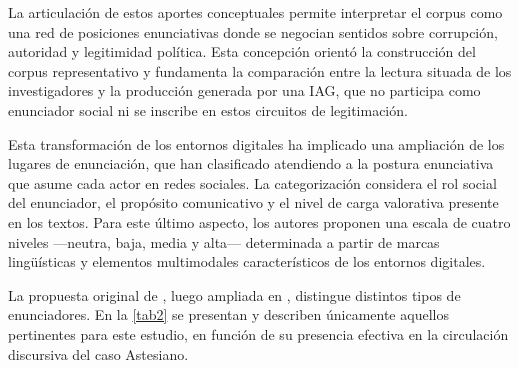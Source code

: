 \documentclass[spanish]{textolivre}
\begin{document}
La articulación de estos aportes conceptuales permite interpretar el corpus como una red de posiciones enunciativas donde se negocian sentidos sobre corrupción, autoridad y legitimidad política. Esta concepción orientó la construcción del corpus representativo y fundamenta la comparación entre la lectura situada de los investigadores y la producción generada por una IAG, que no participa como enunciador social ni se inscribe en estos circuitos de legitimación.

Esta transformación de los entornos digitales ha implicado una ampliación de los lugares de enunciación, que  \textcite{gambetta2021desequilibrio,gambettaabella2024media} han clasificado atendiendo a la postura enunciativa que asume cada actor en redes sociales. La categorización considera el rol social del enunciador, el propósito comunicativo y el nivel de carga valorativa presente en los textos. Para este último aspecto, los autores proponen una escala de cuatro niveles —neutra, baja, media y alta— determinada a partir de marcas lingüísticas y elementos multimodales característicos de los entornos digitales.

La propuesta original de \textcite{gambetta2021desequilibrio}, luego ampliada en \textcite{gambetta2022enunciador,gambettaabella2024media}, distingue distintos tipos de enunciadores. En la \cref{tab2} se presentan y describen únicamente aquellos pertinentes para este estudio, en función de su presencia efectiva en la circulación discursiva del caso Astesiano.
\end{document}
